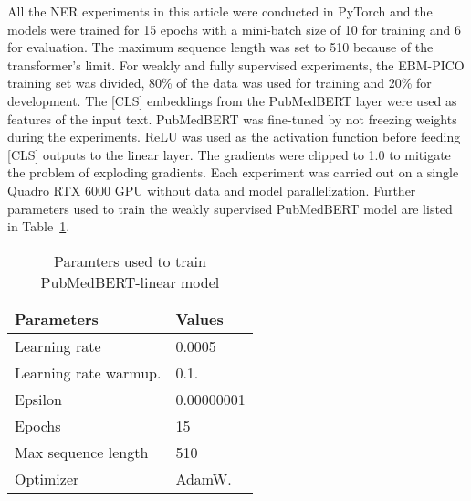 \documentclass[10.7pt,]{article}
\begin{document}
All the NER experiments in this article were conducted in PyTorch and the models were trained for 15 epochs with a mini-batch size of 10 for training and 6 for evaluation.
The maximum sequence length was set to 510 because of the transformer's limit.
For weakly and fully supervised experiments, the EBM-PICO training set was divided, 80\% of the data was used for training and 20\% for development.
The [CLS] embeddings from the PubMedBERT layer were used as features of the input text.
PubMedBERT was fine-tuned by not freezing weights during the experiments.
ReLU was used as the activation function before feeding [CLS] outputs to the linear layer.
The gradients were clipped to 1.0 to mitigate the problem of exploding gradients.
Each experiment was carried out on a single Quadro RTX 6000 GPU without data and model parallelization.
Further parameters used to train the weakly supervised PubMedBERT model are listed in Table~\ref{ws:params}.
%
\begin{table}[ht]
\centering
\begin{tabular}{|l|l|}
\hline
Parameters               & Values                            \\
\hline
Learning rate           & 0.0005                             \\
Learning rate warmup.   & 0.1.                               \\
Epsilon                 & 0.00000001                         \\
Epochs                  & 15                                 \\
Max sequence length     & 510                                \\
Optimizer               & AdamW.                             \\
\hline
\end{tabular}
\caption{\label{ws:params} Paramters used to train PubMedBERT-linear model}
\end{table}
%
%
%
%
%
\end{document}
